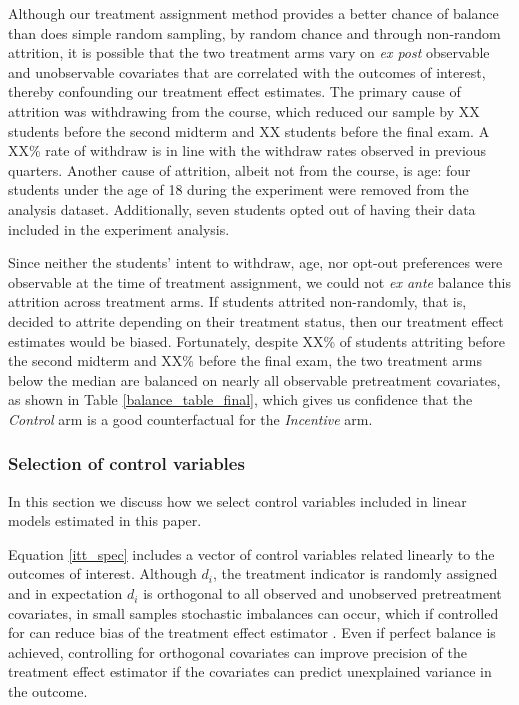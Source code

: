 \documentclass[12pt]{article}
\begin{document}
Although our treatment assignment method provides a better chance of balance than does simple random sampling, by random chance and through non-random attrition, it is possible that the two treatment arms vary on \textit{ex post} observable and unobservable covariates that are correlated with the outcomes of interest, thereby confounding our treatment effect estimates. The primary cause of attrition was withdrawing from the course, which reduced our sample by XX students before the second midterm and XX students before the final exam. A XX\% rate of withdraw is in line with the withdraw rates observed in previous quarters. Another cause of attrition, albeit not from the course, is age: four students under the age of 18 during the experiment were removed from the analysis dataset. Additionally, seven students opted out of having their data included in the experiment analysis.

Since neither the students' intent to withdraw, age, nor opt-out preferences were observable at the time of treatment assignment, we could not \textit{ex ante} balance this attrition across treatment arms. If students attrited non-randomly, that is, decided to attrite depending on their treatment status, then our treatment effect estimates would be biased. Fortunately, despite XX\% of students attriting before the second midterm and XX\% before the final exam, the two treatment arms below the median are balanced on nearly all observable pretreatment covariates, as shown in Table \ref{balance_table_final}, which gives us confidence that the \textit{Control} arm is a good counterfactual for the \textit{Incentive} arm.

\subsubsection{Selection of control variables} \label{a_selection}

In this section we discuss how we select control variables included in linear models estimated in this paper.

Equation \ref{itt_spec} includes a vector of control variables related linearly to the outcomes of interest. Although $d_i$, the treatment indicator is randomly assigned and in expectation $d_i$ is orthogonal to all observed and unobserved pretreatment covariates, in small samples stochastic imbalances can occur, which if controlled for can reduce bias of the treatment effect estimator \parencite{ai2017}. Even if perfect balance is achieved, controlling for orthogonal covariates can improve precision of the treatment effect estimator if the covariates can predict unexplained variance in the outcome.
\end{document}
